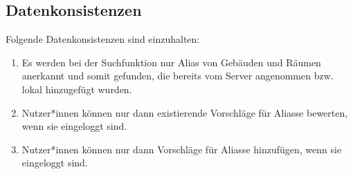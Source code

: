 \subsection{Datenkonsistenzen}

Folgende Datenkonsistenzen sind einzuhalten:
\begin{enumerate}[label=\textbf{/T\arabic*0/}, align=left, resume]
	\item Es werden bei der Suchfunktion nur Alias von Gebäuden und Räumen anerkannt und somit gefunden, die bereits vom Server angenommen bzw. lokal hinzugefügt wurden.
	\item Nutzer*innen können nur dann existierende Vorschläge für Aliasse bewerten, wenn sie eingeloggt sind.
	\item Nutzer*innen können nur dann Vorschläge für Aliasse hinzufügen, wenn sie eingeloggt sind.
\end{enumerate}